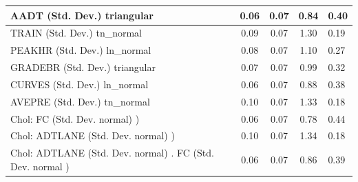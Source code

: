 \begin{table}
\begin{center}
\begin{tabular}{|l|l|c|c|c|l|}
			\hline
			AADT (Std. Dev.) triangular &  & 0.06 & 0.07 & 0.84 & 0.40 \\
			\hline
			TRAIN (Std. Dev.) tn_normal &  & 0.09 & 0.07 & 1.30 & 0.19 \\
			\hline
			PEAKHR (Std. Dev.) ln_normal &  & 0.08 & 0.07 & 1.10 & 0.27 \\
			\hline
			GRADEBR (Std. Dev.) triangular &  & 0.07 & 0.07 & 0.99 & 0.32 \\
			\hline
			CURVES (Std. Dev.) ln_normal &  & 0.06 & 0.07 & 0.88 & 0.38 \\
			\hline
			AVEPRE (Std. Dev.) tn_normal &  & 0.10 & 0.07 & 1.33 & 0.18 \\
			\hline
			 Chol: FC (Std. Dev. normal) ) &  & 0.06 & 0.07 & 0.78 & 0.44 \\
			\hline
			 Chol: ADTLANE (Std. Dev. normal) ) &  & 0.10 & 0.07 & 1.34 & 0.18 \\
			\hline
			 Chol: ADTLANE (Std. Dev. normal) . FC (Std. Dev.   normal ) &  & 0.06 & 0.07 & 0.86 & 0.39 \\
			\hline
		\end{tabular}
	\end{center}
\end{table}